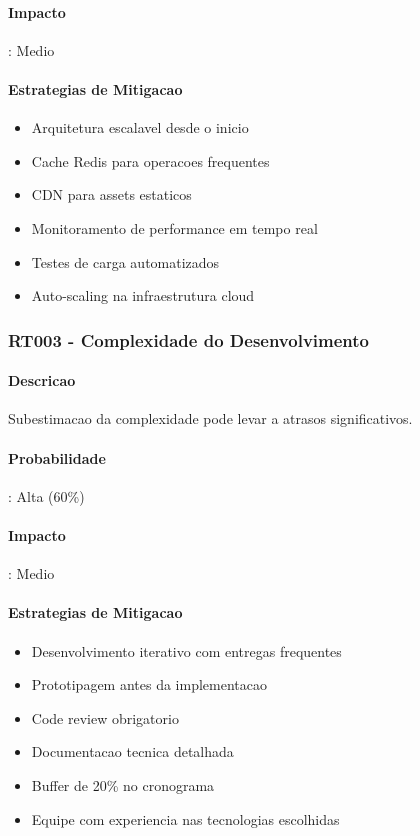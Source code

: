 \paragraph{Impacto}: Medio

\paragraph{Estrategias de Mitigacao}
\begin{itemize}
    \item Arquitetura escalavel desde o inicio
    \item Cache Redis para operacoes frequentes
    \item CDN para assets estaticos
    \item Monitoramento de performance em tempo real
    \item Testes de carga automatizados
    \item Auto-scaling na infraestrutura cloud
\end{itemize}

\subsubsection{RT003 - Complexidade do Desenvolvimento}

\paragraph{Descricao}
Subestimacao da complexidade pode levar a atrasos significativos.

\paragraph{Probabilidade}: Alta (60\%)
\paragraph{Impacto}: Medio

\paragraph{Estrategias de Mitigacao}
\begin{itemize}
    \item Desenvolvimento iterativo com entregas frequentes
    \item Prototipagem antes da implementacao
    \item Code review obrigatorio
    \item Documentacao tecnica detalhada
    \item Buffer de 20\% no cronograma
    \item Equipe com experiencia nas tecnologias escolhidas
\end{itemize}

